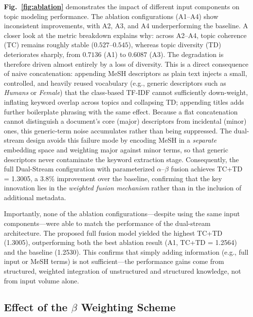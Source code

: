 \documentclass[authorproof,JACIII,researchpaper]{fujipressarticle}
\begin{document}
{\color{red}%
\textbf{Fig.~\ref{fig:ablation}} demonstrates the impact of different input components on topic modeling performance. The ablation configurations (A1--A4) show inconsistent improvements, with A2, A3, and A4 underperforming the baseline. A closer look at the metric breakdown explains why: across A2--A4, topic coherence (TC) remains roughly stable ($0.527$--$0.545$), whereas topic diversity (TD) deteriorates sharply, from $0.7136$ (A1) to $0.6087$ (A3). The degradation is therefore driven almost entirely by a loss of diversity. This is a direct consequence of naive concatenation: appending MeSH descriptors as plain text injects a small, controlled, and heavily reused vocabulary (e.g., generic descriptors such as \textit{Humans} or \textit{Female}) that the class-based TF-IDF cannot sufficiently down-weight, inflating keyword overlap across topics and collapsing TD; appending titles adds further boilerplate phrasing with the same effect. Because a flat concatenation cannot distinguish a document's core (major) descriptors from incidental (minor) ones, this generic-term noise accumulates rather than being suppressed. The dual-stream design avoids this failure mode by encoding MeSH in a \emph{separate} embedding space and weighting major against minor terms, so that generic descriptors never contaminate the keyword extraction stage. Consequently, the full Dual-Stream configuration with parameterized $\alpha$--$\beta$ fusion achieves TC+TD = 1.3005, a $3.8\%$ improvement over the baseline, confirming that the key innovation lies in the \emph{weighted fusion mechanism} rather than in the inclusion of additional metadata.
}%

Importantly, none of the ablation configurations---despite using the same input components---were able to match the performance of the dual-stream architecture. The proposed full fusion model yielded the highest TC+TD (1.3005), outperforming both the best ablation result (A1, TC+TD = 1.2564) and the baseline (1.2530). This confirms that simply adding information (e.g., full input or MeSH terms) is not sufficient---the performance gains come from structured, weighted integration of unstructured and structured knowledge, not from input volume alone.

{\color{red}%
\subsection{Effect of the $\beta$ Weighting Scheme}
\label{subsec:beta_norm}
}%
\end{document}
